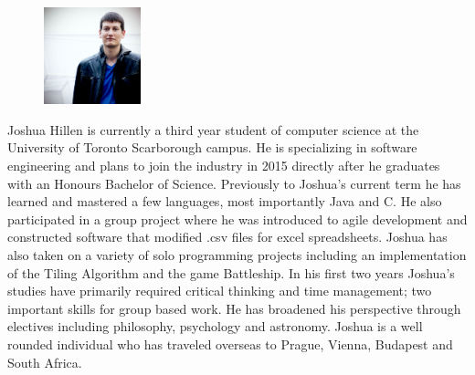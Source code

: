 \documentclass[pdftex,10pt,a4paper]{report}
\begin{document}
\begin{figure}
  \vspace{-20pt}
  \begin{center}
    \includegraphics[width=0.25\textwidth]{img/group/josh}
  \end{center}
  \vspace{-20pt}
\end{figure}
Joshua Hillen is currently a third year student of computer science at the University of Toronto Scarborough campus. He is specializing in software engineering and plans to join the industry in 2015 directly after he graduates with an Honours Bachelor of Science. Previously to Joshua's current term he has learned and mastered a few languages, most importantly Java and C. He also participated in a group project where he was introduced to agile development and constructed software that modified .csv files for excel spreadsheets. Joshua has also taken on a variety of solo programming projects including an implementation of the Tiling Algorithm and the game Battleship. In his first two years Joshua's studies have primarily required critical thinking and time management; two important skills for group based work. He has broadened his perspective through electives including philosophy, psychology and astronomy. Joshua is a well rounded individual who has traveled overseas to Prague, Vienna, Budapest and South Africa.\\
\end{document}
